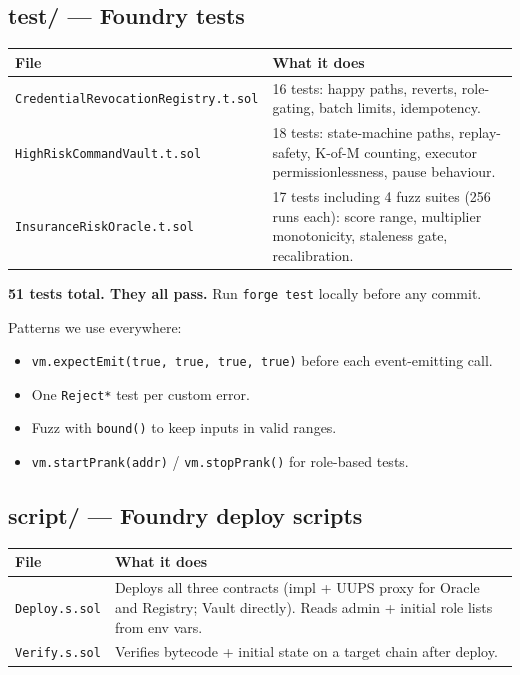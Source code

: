 \documentclass[11pt,a4paper]{article}
\begin{document}
\subsection{test/ --- Foundry tests}

\begin{center}
\begin{tabular}{p{5cm} p{10.5cm}}
\toprule
{\bfseries\color{axiprimary}File} & {\bfseries\color{axiprimary}What it does} \\
\midrule
\texttt{CredentialRevocationRegistry.t.sol} & 16 tests: happy paths, reverts, role-gating, batch limits, idempotency. \\
\addlinespace[2pt]
\texttt{HighRiskCommandVault.t.sol} & 18 tests: state-machine paths, replay-safety, K-of-M counting, executor permissionlessness, pause behaviour. \\
\addlinespace[2pt]
\texttt{InsuranceRiskOracle.t.sol} & 17 tests including 4 fuzz suites (256 runs each): score range, multiplier monotonicity, staleness gate, recalibration. \\
\bottomrule
\end{tabular}
\end{center}

\textbf{51 tests total. They all pass.} Run \texttt{forge test} locally before any commit.

Patterns we use everywhere:

\begin{itemize}[leftmargin=*, nosep]
  \item \texttt{vm.expectEmit(true, true, true, true)} before each event-emitting call.
  \item One \texttt{Reject*} test per custom error.
  \item Fuzz with \texttt{bound()} to keep inputs in valid ranges.
  \item \texttt{vm.startPrank(addr)} / \texttt{vm.stopPrank()} for role-based tests.
\end{itemize}

\subsection{script/ --- Foundry deploy scripts}

\begin{center}
\begin{tabular}{p{3cm} p{12.5cm}}
\toprule
{\bfseries\color{axiprimary}File} & {\bfseries\color{axiprimary}What it does} \\
\midrule
\texttt{Deploy.s.sol} & Deploys all three contracts (impl + UUPS proxy for Oracle and Registry; Vault directly). Reads admin + initial role lists from env vars. \\
\addlinespace[2pt]
\texttt{Verify.s.sol} & Verifies bytecode + initial state on a target chain after deploy. \\
\bottomrule
\end{tabular}
\end{center}
\end{document}
